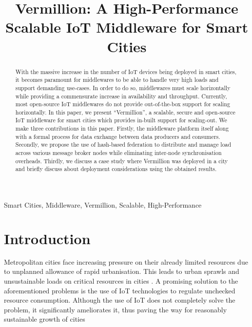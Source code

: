 \documentclass[conference, 10pt]{IEEEtran}
\begin{document}



\title{Vermillion: A High-Performance Scalable IoT Middleware for Smart Cities}
\author{
}

\maketitle

\begin{abstract}
With the massive increase in the number of IoT devices being deployed in smart cities, it becomes paramount for middlewares to be able to handle very high loads and support demanding use-cases. In order to do so, middlewares must scale horizontally while providing a commensurate increase in availability and throughput. Currently, most open-source IoT middlewares do not provide out-of-the-box support for scaling horizontally. In this paper, we present ``Vermillion'', a scalable, secure and open-source IoT middleware for smart cities which provides in-built support for scaling-out. We make three contributions in this paper. Firstly, the middleware platform itself along with a formal process for data exchange between data producers and consumers. Secondly, we propose the use of hash-based federation to distribute and manage load across various message broker nodes while eliminating inter-node synchronisation overheads. Thirdly, we discuss a case study where Vermillion was deployed in a city and briefly discuss about deployment considerations using the obtained results.
\end{abstract}

\begin{IEEEkeywords}
Smart Cities, Middleware, Vermillion, Scalable, High-Performance
\end{IEEEkeywords}

\section{Introduction}
Metropolitan cities face increasing pressure on their already limited resources due to unplanned allowance of rapid urbanisation. This leads to urban sprawls and unsustainable loads on critical resources in cities \cite{tian2017impacts}. A promising solution to the aforementioned problems is the use of IoT technologies to regulate unchecked resource consumption. Although the use of IoT does not completely solve the problem, it significantly ameliorates it, thus paving the way for reasonably sustainable growth of cities \cite{su2011smart}
\end{document}
